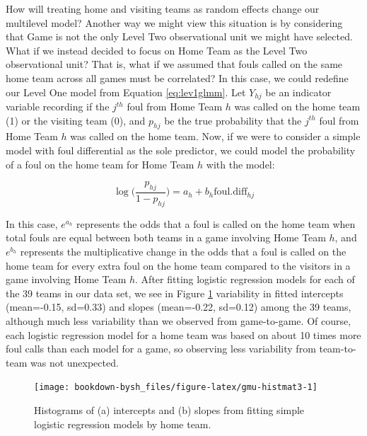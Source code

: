 \documentclass[
]{krantz}
\begin{document}
How will treating home and visiting teams as random effects change our multilevel model? Another way we might view this situation is by considering that Game is not the only Level Two observational unit we might have selected. What if we instead decided to focus on Home Team as the Level Two observational unit? That is, what if we assumed that fouls called on the same home team across all games must be correlated? In this case, we could redefine our Level One model from Equation \eqref{eq:lev1glmm}. Let \(Y_{hj}\) be an indicator variable recording if the \(j^{th}\) foul from Home Team \(h\) was called on the home team (1) or the visiting team (0), and \(p_{hj}\) be the true probability that the \(j^{th}\) foul from Home Team \(h\) was called on the home team. Now, if we were to consider a simple model with foul differential as the sole predictor, we could model the probability of a foul on the home team for Home Team \(h\) with the model:

\begin{equation*}
\log\bigg(\frac{p_{hj}}{1-p_{hj}}\bigg)=a_h+b_h\mathrm{foul.diff}_{hj}
\end{equation*}

In this case, \(e^{a_{h}}\) represents the odds that a foul is called on the home team when total fouls are equal between both teams in a game involving Home Team \(h\), and \(e^{b_{h}}\) represents the multiplicative change in the odds that a foul is called on the home team for every extra foul on the home team compared to the visitors in a game involving Home Team \(h\). After fitting logistic regression models for each of the 39 teams in our data set, we see in Figure \ref{fig:gmu-histmat3} variability in fitted intercepts (mean=-0.15, sd=0.33) and slopes (mean=-0.22, sd=0.12) among the 39 teams, although much less variability than we observed from game-to-game. Of course, each logistic regression model for a home team was based on about 10 times more foul calls than each model for a game, so observing less variability from team-to-team was not unexpected.

\begin{figure}

{\centering \texttt{[image: bookdown-bysh\_files/figure-latex/gmu-histmat3-1]} 

}

\caption{Histograms of (a) intercepts and (b) slopes from fitting simple logistic regression models by home team.}\label{fig:gmu-histmat3}
\end{figure}
\end{document}
